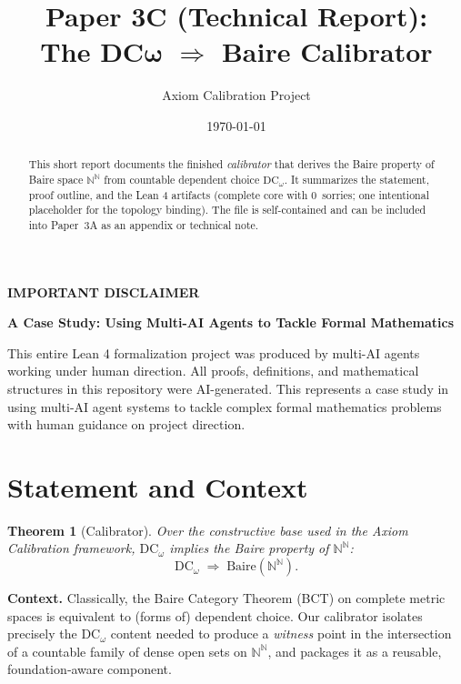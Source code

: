 \documentclass[11pt]{article}
\title{\vspace{-1ex}Paper 3C (Technical Report): \\
  \smallskip
  \Large The DC$\boldsymbol{\omega}$ $\Rightarrow$ Baire Calibrator}
\author{\small Axiom Calibration Project}
\date{\small \today}
\newcommand{\NN}{\mathbb{N}}
\newcommand{\Seq}{\NN^{\NN}}  %
\newcommand{\DCw}{\mathrm{DC}_\omega}
\newcommand{\BaireNN}{\mathrm{Baire}(\NN^\NN)}
\theoremstyle{definition}
\theoremstyle{plain}
\newtheorem{theorem}{Theorem}
\begin{document}
\maketitle
\vspace{-1.25ex}

\begin{abstract}\noindent
This short report documents the finished \emph{calibrator} that derives the
Baire property of Baire space $\Seq$ from countable dependent choice $\DCw$.
It summarizes the statement, proof outline, and the Lean 4 artifacts
(complete core with $0$~sorries; one intentional placeholder for the topology
binding). The file is self-contained and can be included into Paper~3A as an
appendix or technical note.
\end{abstract}

\begin{mdframed}[backgroundcolor=gray!10, linewidth=0pt]
\textbf{IMPORTANT DISCLAIMER}

\textbf{A Case Study: Using Multi-AI Agents to Tackle Formal Mathematics}

This entire Lean 4 formalization project was produced by multi-AI agents working under human direction. All proofs, definitions, and mathematical structures in this repository were AI-generated. This represents a case study in using multi-AI agent systems to tackle complex formal mathematics problems with human guidance on project direction.
\end{mdframed}

\section{Statement and Context}
\label{sec:statement}
\begin{theorem}[Calibrator]\label{thm:dcw-baire}
Over the constructive base used in the Axiom Calibration framework,
$\DCw$ implies the Baire property of $\Seq$:
\[
\DCw \;\Rightarrow\; \BaireNN.
\]
\end{theorem}

\noindent
\textbf{Context.} Classically, the Baire Category Theorem (BCT) on complete
metric spaces is equivalent to (forms of) dependent choice. Our calibrator
isolates precisely the $\DCw$ content needed to produce a \emph{witness}
point in the intersection of a countable family of dense open sets on
$\Seq$, and packages it as a reusable, foundation‑aware component.
\end{document}
